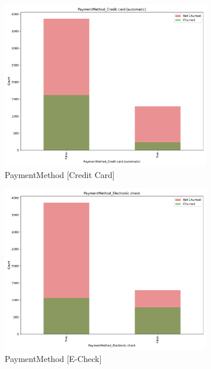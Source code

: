 \documentclass[a4paper,11pt]{article}
\begin{document}
\begin{landscape}
\begin{figure}
\begin{subfigure}{0.14\linewidth}
        \includegraphics[width=\linewidth]{figures/understanding/PaymentMethod_Credit card (automatic).pdf}
        \caption{PaymentMethod [Credit Card]}
    \end{subfigure}
    \begin{subfigure}{0.14\linewidth}
        \includegraphics[width=\linewidth]{figures/understanding/PaymentMethod_Electronic check.pdf}
        \caption{PaymentMethod [E-Check]}
    \end{subfigure}
    \begin{subfigure}{0.14\linewidth}

\end{subfigure}
\end{figure}
\end{landscape}
\end{document}
